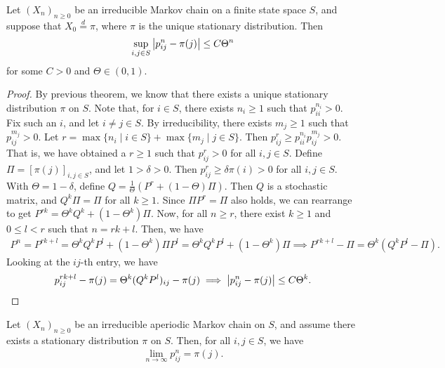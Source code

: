 \begin{theorem}
    Let $(X_{n})_{n \geq 0}$ be an irreducible Markov chain on a finite state space $S$, and suppose that $X_{0} \overset{d}{=} \pi$, where $\pi$ is the unique stationary distribution. Then
    \begin{align}
        \sup_{i,j \in S} \left| p_{ij}^{n} - \pi(j) \right| \leq C \Theta^{n}
    \end{align}
    for some $C > 0$ and $\Theta \in (0,1)$.
\end{theorem}
\begin{proof}
    By previous theorem, we know that there exists a unique stationary distribution $\pi$ on $S$. Note that, for $i \in S$, there exists $n_{i} \geq 1$ such that $p_{ii}^{n_{i}} > 0$. Fix such an $i$, and let $i \neq j \in S$. By irreducibility, there exists $m_{j} \geq 1$ such that $p_{ij}^{m_{j}} > 0$. Let $r = \max\{n_{i} \mid i \in S\} + \max\{m_{j} \mid j \in S\}$. Then $p_{ij}^{r} \geq p_{ii}^{n_{i}}p_{ij}^{m_{j}} > 0$. That is, we have obtained a $r \geq 1$ such that $p_{ij}^{r} > 0$ for all $i,j \in S$. Define $\Pi = [\pi(j)]_{i,j \in S}$, and let $1 > \delta > 0$. Then $p_{ij}^{r} \geq \delta \pi(i) > 0$ for all $i,j \in S$. With $\Theta = 1-\delta$, define $Q = \frac{1}{\Theta}(P^{r}+(1-\Theta)\Pi)$. Then $Q$ is a stochastic matrix, and $Q^{k}\Pi = \Pi$ for all $k \geq 1$. Since $\Pi P^{r} = \Pi$ also holds, we can rearrange to get $P^{rk} = \Theta^{k}Q^{k} + (1-\Theta^{k})\Pi$. Now, for all $n \geq r$, there exist $k \geq 1$ and $0 \leq l < r$ such that $n = rk + l$. Then, we have
    \begin{align}
        P^{n} = P^{rk+l} = \Theta^{k}Q^{k}P^{l} + (1-\Theta^{k})\Pi P^{l} = \Theta^{k}Q^{k}P^{l} + (1-\Theta^{k})\Pi \implies P^{rk+l}-\Pi = \Theta^{k}(Q^{k}P^{l}-\Pi).
    \end{align}
    Looking at the $ij$-th entry, we have
    \begin{align}
        p_{ij}^{rk+l}-\pi(j) = \Theta^{k}(Q^{k}P^{l})_{ij}-\pi(j) \implies \left| p_{ij}^{n}-\pi(j) \right| \leq C\Theta^{k}.
    \end{align}
\end{proof}

\begin{theorem}
    Let $(X_{n})_{n \geq 0}$ be an irreducible aperiodic Markov chain on $S$, and assume there exists a stationary distribution $\pi$ on $S$. Then, for all $i,j \in S$, we have
    \begin{align}
        \lim_{n \to \infty} p_{ij}^{n} = \pi(j).
    \end{align}
\end{theorem}

